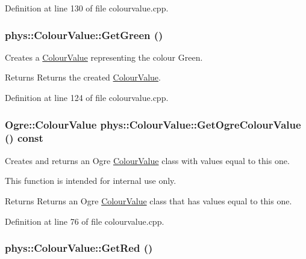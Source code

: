 Definition at line 130 of file colourvalue.cpp.

\hypertarget{classphys_1_1ColourValue_abe2c8f2cb0a609af18238fec49630a78}{
\subsubsection[{GetGreen}]{ phys::ColourValue::GetGreen ()}}
\label{d3/db0/classphys_1_1ColourValue_abe2c8f2cb0a609af18238fec49630a78}


Creates a \hyperlink{classphys_1_1ColourValue}{ColourValue} representing the colour Green. 

\begin{DoxyReturn}{Returns}
Returns the created \hyperlink{classphys_1_1ColourValue}{ColourValue}. 
\end{DoxyReturn}


Definition at line 124 of file colourvalue.cpp.

\hypertarget{classphys_1_1ColourValue_a025ed32506fe3df9e360dc00f3fb4898}{
\subsubsection[{GetOgreColourValue}]{\setlength{\rightskip}{0pt plus 5cm}Ogre::ColourValue phys::ColourValue::GetOgreColourValue () const}}
\label{d3/db0/classphys_1_1ColourValue_a025ed32506fe3df9e360dc00f3fb4898}


Creates and returns an Ogre \hyperlink{classphys_1_1ColourValue}{ColourValue} class with values equal to this one. 

This function is intended for internal use only. \begin{DoxyReturn}{Returns}
Returns an Ogre \hyperlink{classphys_1_1ColourValue}{ColourValue} class that has values equal to this one. 
\end{DoxyReturn}


Definition at line 76 of file colourvalue.cpp.

\hypertarget{classphys_1_1ColourValue_ada0b48c5bedd42446f9d2dc202c7b226}{
\subsubsection[{GetRed}]{ phys::ColourValue::GetRed ()}}
\label{d3/db0/classphys_1_1ColourValue_ada0b48c5bedd42446f9d2dc202c7b226}


